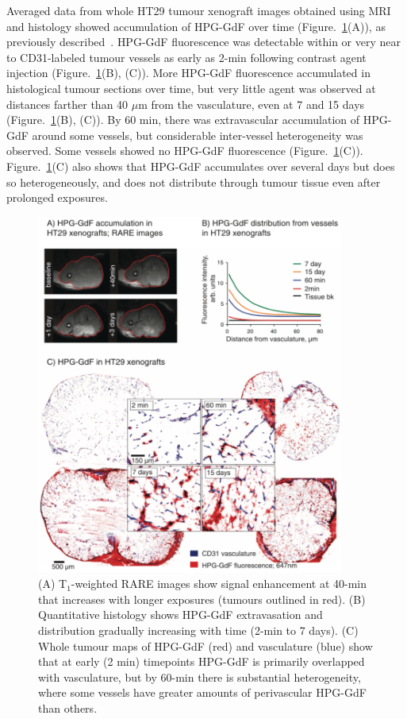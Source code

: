 Averaged data from whole HT29 tumour xenograft images obtained using MRI and histology showed accumulation of \acs{HPG-GdF} over time (Figure.~\ref{hpgpaper1:fig3}(A)), as previously described~\cite{Saatchi:2012hc}.
\acs{HPG-GdF} fluorescence was detectable within or very near to \acs{CD31}-labeled tumour vessels as early as 2-min following contrast agent injection (Figure.~\ref{hpgpaper1:fig3}(B), (C)).
More \acs{HPG-GdF} fluorescence accumulated in histological tumour sections over time, but very little agent was observed at distances farther than 40 $\mu$m from the vasculature, even at 7 and 15 days (Figure.~\ref{hpgpaper1:fig3}(B), (C)).
By 60 min, there was extravascular accumulation of \acs{HPG-GdF} around some vessels, but considerable inter-vessel heterogeneity was observed.
Some vessels showed no \acs{HPG-GdF} fluorescence (Figure.~\ref{hpgpaper1:fig3}(C)).
Figure.~\ref{hpgpaper1:fig3}(C) also shows that \acs{HPG-GdF} accumulates over several days but does so heterogeneously, and does not distribute through tumour tissue even after prolonged exposures.

\begin{figure}[htbp]
 \includegraphics[width=0.9\textwidth]{hpg/hpg-paper1-images/hpg_fig3-hpgdistribution.png}
 \caption{(A) T$_1$-weighted \acs{RARE} images show signal enhancement at 40-min that increases with longer exposures (tumours outlined in red). (B) Quantitative histology shows \acs{HPG-GdF} extravasation and distribution gradually increasing with time (2-min to 7 days). (C) Whole tumour maps of \acs{HPG-GdF} (red) and vasculature (blue) show that at early (2 min) timepoints \acs{HPG-GdF} is primarily overlapped with vasculature, but by 60-min there is substantial heterogeneity, where some vessels have greater amounts of perivascular \acs{HPG-GdF} than others.}
 \label{hpgpaper1:fig3}
\end{figure}

